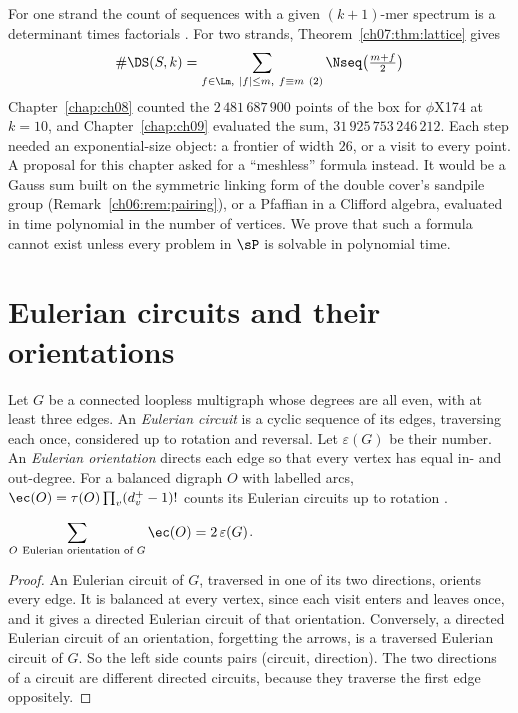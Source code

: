 For one strand the count of sequences with a given $(k+1)$-mer spectrum is a determinant times
factorials \cite{BEST}. For two strands, Theorem~\ref{ch07:thm:lattice} gives
\[
\#\DS(S,k)=\sum_{f\in\Lm,\ |f|\le m,\ f\equiv m\ (2)}\Nseq\bigl(\tfrac{m+f}2\bigr)
\]
Chapter~\ref{chap:ch08} counted the $2\,481\,687\,900$ points of the box for $\phi$X174 at $k=10$, and Chapter~\ref{chap:ch09}
evaluated the sum, $31\,925\,753\,246\,212$. Each step needed an exponential-size
object: a frontier of width $26$, or a visit to every point. A proposal for this chapter asked for a
``meshless'' formula instead. It would be a Gauss sum built on the symmetric linking form of the double
cover's sandpile group (Remark~\ref{ch06:rem:pairing}), or a Pfaffian in a Clifford algebra, evaluated in time polynomial in the
number of vertices. We prove that such a formula cannot exist unless every problem in $\sP$ is solvable
in polynomial time.

\section{Eulerian circuits and their orientations}\label{ch10:sec:euler}

Let $G$ be a connected loopless multigraph whose degrees are all even, with at least three edges. An
\emph{Eulerian circuit} is a cyclic sequence of its edges, traversing each once, considered up to
rotation and reversal. Let $\varepsilon(G)$ be their number. An \emph{Eulerian orientation} directs
each edge so that every vertex has equal in- and out-degree. For a balanced digraph $O$ with labelled
arcs, $\ec(O)=\tau(O)\prod_v(d^+_v-1)!$ counts its Eulerian circuits up to rotation \cite{BEST}.

\begin{lemma}\label{ch10:lem:orient}
$\displaystyle\sum_{O\ \text{Eulerian orientation of }G}\ec(O)=2\,\varepsilon(G)$.
\end{lemma}

\begin{proof}
An Eulerian circuit of $G$, traversed in one of its two directions, orients every edge. It is balanced at
every vertex, since each visit enters and leaves once, and it gives a directed Eulerian circuit of that
orientation. Conversely, a directed Eulerian circuit of an orientation, forgetting the arrows, is a
traversed Eulerian circuit of $G$. So the left side counts pairs (circuit, direction). The two directions
of a circuit are different directed circuits, because they traverse the first edge oppositely.
\end{proof}

